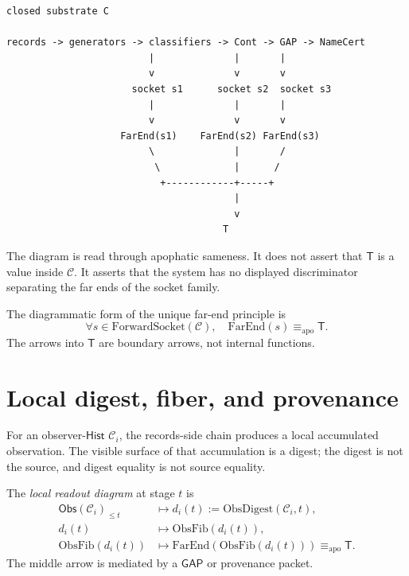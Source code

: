 \begin{center}
\begin{minipage}{0.92\textwidth}
\begin{verbatim}
closed substrate C

records -> generators -> classifiers -> Cont -> GAP -> NameCert
                         |              |       |
                         v              v       v
                      socket s1      socket s2  socket s3
                         |              |       |
                         v              v       v
                    FarEnd(s1)    FarEnd(s2) FarEnd(s3)
                         \              |       /
                          \             |      /
                           +------------+-----+
                                        |
                                        v
                                      T
\end{verbatim}
\end{minipage}
\end{center}

The diagram is read through apophatic sameness. It does not assert that
$\mathsf{T}$ is a value inside $\mathcal{C}$. It asserts that the system has
no displayed discriminator separating the far ends of the socket family.

\begin{principle}
\label{prin:far-end-diagrammatic-unity}
The diagrammatic form of the unique far-end principle is
$$
\forall s \in \mathrm{ForwardSocket}(\mathcal{C}),\quad
\mathrm{FarEnd}(s) \equiv_{\mathrm{apo}} \mathsf{T}.
$$
The arrows into $\mathsf{T}$ are boundary arrows, not internal functions.
\end{principle}

\section{Local digest, fiber, and provenance}
\label{sec:far-end-diagrammatics-local-digest}

For an observer-$\mathsf{Hist}$ $\mathcal{C}_i$, the records-side chain
produces a local accumulated observation. The visible surface of that
accumulation is a digest; the digest is not the source, and digest equality is
not source equality.

\begin{definition}
\label{def:far-end-local-readout-diagram}
The \emph{local readout diagram} at stage $t$ is
$$
\begin{aligned}
\mathsf{Obs}(\mathcal{C}_i)_{\leq t}
&\longmapsto
d_i(t):=\mathrm{ObsDigest}(\mathcal{C}_i,t),\\
d_i(t)
&\longmapsto
\mathrm{ObsFib}(d_i(t)),\\
\mathrm{ObsFib}(d_i(t))
&\longmapsto
\mathrm{FarEnd}(\mathrm{ObsFib}(d_i(t)))
\equiv_{\mathrm{apo}} \mathsf{T}.
\end{aligned}
$$
The middle arrow is mediated by a $\mathsf{GAP}$ or provenance packet.
\end{definition}

